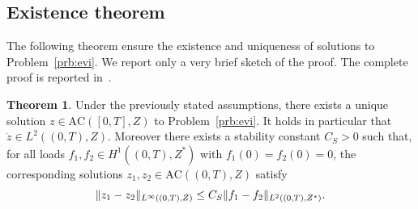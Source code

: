 \documentclass[a4paper,10pt,twoside]{amsbook}
\numberwithin{section}{chapter}
\numberwithin{equation}{chapter}
\theoremstyle{definition}
\newtheorem{thm}[prop]{Theorem}
\DeclarePairedDelimiter{\norm}{\lVert}{\rVert}
\DeclarePairedDelimiter{\dual}{\langle}{\rangle}
\begin{document}
\subsection{Existence theorem}
The following theorem ensure the existence and uniqueness of solutions to Problem~\ref{prb:evi}. We report only a very brief sketch of the proof. The complete proof is reported in~\cite[Theorem 7.3, Theorem 7.4]{han-reddy}.
\begin{thm}
\label{thm:han-reddy}
Under the previously stated assumptions, there exists a unique solution $z\in\text{AC}([0,T],Z)$ to Problem~\ref{prb:evi}. It holds in particular that $\dot z\in L^2((0,T),Z)$. Moreover there exists a stability constant $C_S>0$ such that, for all loads $f_1,f_2\in H^1((0,T),Z^*)$ with $f_1(0)=f_2(0)=0$, the corresponding solutions $z_1,z_2\in\text{AC}((0,T),Z)$ satisfy
\[
\norm{z_1-z_2}_{L^\infty((0,T),Z)}\le C_S\norm{f_1-f_2}_{L^2((0,T),Z^*)}.
\]
\end{thm}
\end{document}
